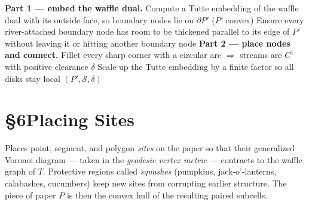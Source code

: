 \documentclass[11pt]{article}
\newcommand{\epsp}{\varepsilon'}
\begin{document}
\begin{algorithm}[H]
\caption[\textsc{PlaceStreams}]{\textsc{PlaceStreams}$(T,\epsp,\Sigma)$ --- route rivers and brooks (\S5)}
\KwData{Tuck proxy $T$; parameter $\epsp$; squashing $\Sigma$.}
\BlankLine
\textbf{Part 1 --- embed the waffle dual.}\;
Compute a Tutte embedding of the waffle dual with its outside face, so
boundary nodes lie on $\partial P'$ ($P'$ convex)\;
Ensure every river-attached boundary node has room to be thickened
parallel to its edge of $P'$ without leaving it or hitting another
boundary node\;
\BlankLine
\textbf{Part 2 --- place nodes and connect.}\;
Fillet every sharp corner with a circular arc $\Rightarrow$ streams are
$C^1$ with positive clearance $\delta$\;
Scale up the Tutte embedding by a finite factor so all disks stay local\;
\KwRet $(P',\mathcal{S},\delta)$\;
\end{algorithm}

\section*{\S6\quad Placing Sites}
Places point, segment, and polygon \emph{sites} on the paper so that
their generalized Voronoi diagram --- taken in the \emph{geodesic vertex
metric} --- contracts to the waffle graph of $T$. Protective regions
called \emph{squashes} (pumpkins, jack-o'-lanterns, calabashes,
cucumbers) keep new sites from corrupting earlier structure. The piece
of paper $P$ is then the convex hull of the resulting paired subcells.
\end{document}

